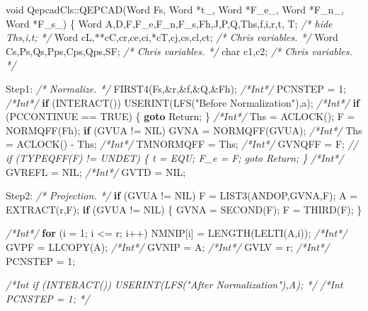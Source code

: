 \documentclass[
]{book}
\newenvironment{Shaded}{\begin{snugshade}}{\end{snugshade}}
\newcommand{\CharTok}[1]{\textcolor[rgb]{0.31,0.60,0.02}{#1}}
\newcommand{\CommentTok}[1]{\textcolor[rgb]{0.56,0.35,0.01}{\textit{#1}}}
\newcommand{\ControlFlowTok}[1]{\textcolor[rgb]{0.13,0.29,0.53}{\textbf{#1}}}
\newcommand{\DataTypeTok}[1]{\textcolor[rgb]{0.13,0.29,0.53}{#1}}
\newcommand{\DecValTok}[1]{\textcolor[rgb]{0.00,0.00,0.81}{#1}}
\newcommand{\NormalTok}[1]{#1}
\newcommand{\StringTok}[1]{\textcolor[rgb]{0.31,0.60,0.02}{#1}}
\theoremstyle{definition}
\theoremstyle{definition}
\theoremstyle{definition}
\theoremstyle{definition}
\theoremstyle{remark}
\begin{document}
\begin{Shaded}
\begin{Highlighting}[numbers=left,,]
\DataTypeTok{void}\NormalTok{ QepcadCls::QEPCAD(Word Fs, Word *t\_, Word *F\_e\_, Word *F\_n\_, Word *F\_s\_)}
\NormalTok{\{}
\NormalTok{    Word A,D,F,F\_e,F\_n,F\_s,Fh,J,P,Q,Ths,f,i,r,t, T;}
    \CommentTok{/* hide Ths,i,t; */}
\NormalTok{    Word cL,**cC,cr,ce,ci,*cT,cj,cs,cl,ct; }\CommentTok{/* Chris variables. */}
\NormalTok{    Word Cs,Ps,Qs,Pps,Cps,Qps,SF; }\CommentTok{/* Chris variables. */}
    \DataTypeTok{char}\NormalTok{ c1,c2; }\CommentTok{/* Chris variables. */}

\NormalTok{Step1: }\CommentTok{/* Normalize. */}
\NormalTok{    FIRST4(Fs,\&r,\&f,\&Q,\&Fh);}
    \CommentTok{/*Int*/}\NormalTok{ PCNSTEP = }\DecValTok{1}\NormalTok{;}
    \CommentTok{/*Int*/} \ControlFlowTok{if}\NormalTok{ (INTERACT()) USERINT(LFS(}\StringTok{"Before Normalization"}\NormalTok{),}\CharTok{\textquotesingle{}a\textquotesingle{}}\NormalTok{);}
    \CommentTok{/*Int*/} \ControlFlowTok{if}\NormalTok{ (PCCONTINUE == TRUE) \{ }\ControlFlowTok{goto}\NormalTok{ Return; \}}
    \CommentTok{/*Int*/}\NormalTok{ Ths = ACLOCK();}
\NormalTok{    F = NORMQFF(Fh);}
    \ControlFlowTok{if}\NormalTok{ (GVUA != NIL) GVNA = NORMQFF(GVUA);}
    \CommentTok{/*Int*/}\NormalTok{ Ths = ACLOCK() {-} Ths;}
    \CommentTok{/*Int*/}\NormalTok{ TMNORMQFF = Ths;}
    \CommentTok{/*Int*/}\NormalTok{ GVNQFF = F;}
    \CommentTok{//       if (TYPEQFF(F) != UNDET) \{ t = EQU; F\_e = F; goto Return; \}}
    \CommentTok{/*Int*/}\NormalTok{ GVREFL = NIL;}
    \CommentTok{/*Int*/}\NormalTok{ GVTD = NIL;}

\NormalTok{Step2: }\CommentTok{/* Projection. */}
    \ControlFlowTok{if}\NormalTok{ (GVUA != NIL) F = LIST3(ANDOP,GVNA,F);}
\NormalTok{    A = EXTRACT(r,F);}
    \ControlFlowTok{if}\NormalTok{ (GVUA != NIL) \{}
\NormalTok{        GVNA = SECOND(F);}
\NormalTok{        F = THIRD(F);}
\NormalTok{    \}}

    \CommentTok{/*Int*/} \ControlFlowTok{for}\NormalTok{ (i = }\DecValTok{1}\NormalTok{; i \textless{}= r; i++) NMNIP[i] = LENGTH(LELTI(A,i));}
    \CommentTok{/*Int*/}\NormalTok{ GVPF = LLCOPY(A);}
    \CommentTok{/*Int*/}\NormalTok{ GVNIP = A;}
    \CommentTok{/*Int*/}\NormalTok{ GVLV = r;}
    \CommentTok{/*Int*/}\NormalTok{ PCNSTEP = }\DecValTok{1}\NormalTok{;}

    \CommentTok{/*Int if (INTERACT()) USERINT(LFS("After Normalization"),\textquotesingle{}A\textquotesingle{}); */}
    \CommentTok{/*Int PCNSTEP = 1; */}


\end{Highlighting}
\end{Shaded}
\end{document}
